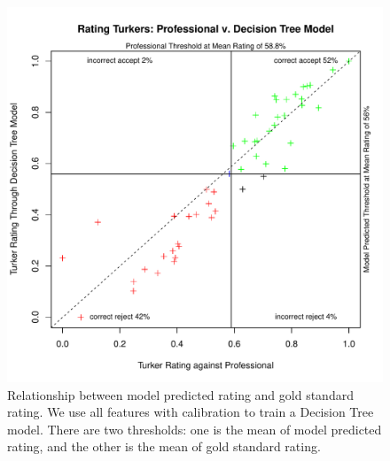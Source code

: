 \documentclass[11pt]{article}
\begin{document}
\begin{figure}[htbp]
  \centering
  \includegraphics[width=\linewidth]{AllFeatureWithCali/rrankingallfeaturewithcalidt2.pdf}
  \caption{Relationship between model predicted rating and gold standard rating. We use all features with calibration to train a Decision Tree model. There are two thresholds: one is the mean of model predicted rating, and the other is the mean of gold standard rating.}
    \label{fdtallcalirrating2}
\end{figure}
\end{document}
